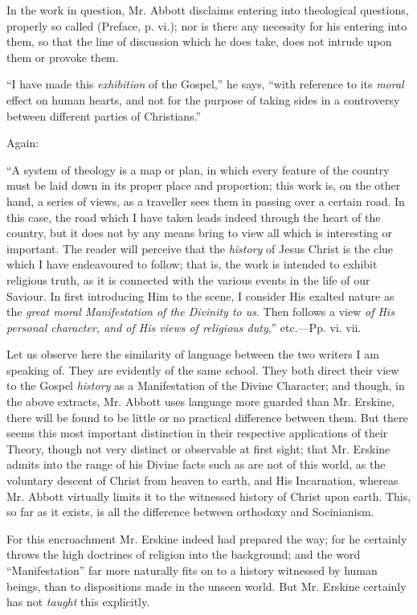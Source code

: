 In the work in question, Mr. Abbott disclaims
entering into theological questions, properly so called (Preface, p.
vi.); nor is there any necessity for his entering into them, so that
the line of discussion which he does take, does not intrude upon them
or provoke them.

``I have made
this \emph{exhibition} of the Gospel,'' he says, ``with reference to its \emph{moral} effect on human hearts, and not for the purpose of taking sides
in a controversy between different parties of Christians.''

Again:

``A system of
theology is a map or plan, in which every feature of the country must
be laid down in its proper place and proportion; this work is, on the
other hand, a series of views, as a traveller sees them in passing
over a certain road. In this case, the road which I have taken leads
indeed through the heart of the country, but it does not by any means
bring to view all which is interesting or important. The reader will
perceive that the \emph{history}
of Jesus Christ is the clue which I have endeavoured to follow;
that is, the work is intended to exhibit religious truth, as it is
connected with the various events in the life of our Saviour. In first
introducing Him to the scene, I consider His exalted nature as the \emph{great
moral Manifestation of the Divinity to us}.
Then follows a view \emph{of
His personal character, and of His views of religious duty},''
etc.—Pp. vi. vii.

Let us observe here the similarity of language
between the two writers I am speaking of. They are evidently of the
same school. They both direct their view to the Gospel \emph{history}
as a Manifestation of the Divine Character; and though, in the
above extracts, Mr. Abbott uses language more guarded than Mr. Erskine,
there will be found to be little or no practical difference between
them. But there seems this most important distinction in their
respective applications of their Theory, though not very distinct or
observable at first sight; that Mr. Erskine admits into the range of
his Divine facts such as are not of this world, as the voluntary
descent of Christ from heaven to earth, and His Incarnation, whereas
Mr. Abbott virtually limits it to the witnessed history of Christ upon
earth. This, so far as it exists, is all the difference between
orthodoxy and Socinianism.

For this encroachment Mr. Erskine indeed had
prepared the way; for he certainly throws the high doctrines of
religion into the background; and the word ``Manifestation'' far
more naturally fits on to a history witnessed by human beings, than to
dispositions made in the unseen world. But Mr. Erskine certainly has
not \emph{taught} this explicitly.

